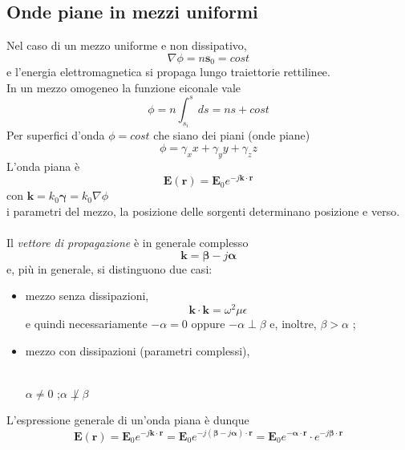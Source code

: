 \documentclass[a4paper]{article}
\begin{document}
\subsection*{Onde piane in mezzi uniformi}
Nel caso di un mezzo uniforme e non dissipativo,
\begin{equation*}
\nabla\phi=n\textbf{s}_0=cost
\end{equation*}
e l'energia elettromagnetica si propaga lungo traiettorie rettilinee.\\
In un mezzo omogeneo la funzione eiconale vale
\begin{equation*}
\phi=n\int_{s_i}^sds=ns+cost
\end{equation*}
Per superfici d'onda $\phi=cost$ che siano dei piani (onde piane)
\begin{equation*}
\phi=\gamma_xx+\gamma_yy+\gamma_zz
\end{equation*}
L'onda piana è
\begin{equation*}
\textbf{E}(\textbf{r})=\textbf{E}_0e^{-j\textbf{k}\cdot\textbf{r}}
\end{equation*}
con $\textbf{k}=k_0\bm{\gamma}=k_0\nabla\phi$\\
i parametri del mezzo, la posizione delle sorgenti determinano posizione e verso.\\\\
Il \emph{vettore di propagazione} è in generale complesso
\begin{equation*}
\textbf{k}=\bm{\beta}-j\bm{\alpha}
\end{equation*}
e, più in generale, si distinguono due casi:
\begin{itemize}
\item mezzo senza dissipazioni,
\begin{equation*}
\textbf{k}\cdot\textbf{k}=\omega^2\mu\epsilon
\end{equation*}
e quindi necessariamente $-\alpha=0$ oppure $-\alpha\perp\beta$ e, inoltre, $\beta>\alpha$ ;
\item mezzo con dissipazioni (parametri complessi),\\\\
\begin{center}
$\alpha\neq0$ ;\hspace{15mm}$\alpha\not\perp\beta$
\end{center}
\end{itemize}
L'espressione generale di un'onda piana è dunque
\begin{equation*}
\textbf{E}(\textbf{r})=\textbf{E}_0e^{-j\textbf{k}\cdot\textbf{r}}=\textbf{E}_0e^{-j(\bm{\beta}-j\bm{\alpha})\cdot\textbf{r}}=\textbf{E}_0e^{-\bm{\alpha}\cdot\textbf{r}}\cdot e^{-j\bm{\beta}\cdot\textbf{r}}
\end{equation*}
\end{document}
